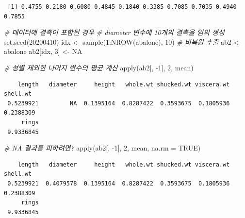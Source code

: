 \documentclass[
  11pt,
]{krantz}
\newenvironment{Shaded}{\begin{snugshade}}{\end{snugshade}}
\newcommand{\AttributeTok}[1]{\textcolor[rgb]{0.61,0.61,0.61}{#1}}
\newcommand{\CommentTok}[1]{\textcolor[rgb]{0.37,0.37,0.37}{\textit{#1}}}
\newcommand{\ConstantTok}[1]{\textcolor[rgb]{0,0,0}{#1}}
\newcommand{\DecValTok}[1]{\textcolor[rgb]{0.06,0.06,0.06}{#1}}
\newcommand{\FunctionTok}[1]{\textcolor[rgb]{0,0,0}{#1}}
\newcommand{\NormalTok}[1]{#1}
\newcommand{\OtherTok}[1]{\textcolor[rgb]{0.37,0.37,0.37}{#1}}
\newcommand{\SpecialCharTok}[1]{\textcolor[rgb]{0,0,0}{#1}}
\begin{document}
\begin{verbatim}
 [1] 0.4755 0.2180 0.6080 0.4845 0.1840 0.3385 0.7085 0.7035 0.4940 0.7855
\end{verbatim}

\begin{Shaded}
\begin{Highlighting}[]
\CommentTok{\# 데이터에 결측이 포함된 경우}
\CommentTok{\# diameter 변수에 10개의 결측을 임의 생성}
\FunctionTok{set.seed}\NormalTok{(}\DecValTok{20200410}\NormalTok{)}
\NormalTok{idx }\OtherTok{\textless{}{-}} \FunctionTok{sample}\NormalTok{(}\DecValTok{1}\SpecialCharTok{:}\FunctionTok{NROW}\NormalTok{(abalone), }\DecValTok{10}\NormalTok{) }\CommentTok{\# 비복원 추출}
\NormalTok{ab2 }\OtherTok{\textless{}{-}}\NormalTok{ abalone}
\NormalTok{ab2[idx, }\DecValTok{3}\NormalTok{] }\OtherTok{\textless{}{-}} \ConstantTok{NA}

\CommentTok{\# 성별 제외한 나머지 변수의 평균 계산}
\FunctionTok{apply}\NormalTok{(ab2[, }\SpecialCharTok{{-}}\DecValTok{1}\NormalTok{], }\DecValTok{2}\NormalTok{, mean)}
\end{Highlighting}
\end{Shaded}

\begin{verbatim}
    length   diameter     height   whole.wt shucked.wt viscera.wt   shell.wt 
 0.5239921         NA  0.1395164  0.8287422  0.3593675  0.1805936  0.2388309 
     rings 
 9.9336845 
\end{verbatim}

\begin{Shaded}
\begin{Highlighting}[]
\CommentTok{\# NA 결과를 피하려면?}
\FunctionTok{apply}\NormalTok{(ab2[, }\SpecialCharTok{{-}}\DecValTok{1}\NormalTok{], }\DecValTok{2}\NormalTok{, mean, }\AttributeTok{na.rm =} \ConstantTok{TRUE}\NormalTok{)}
\end{Highlighting}
\end{Shaded}

\begin{verbatim}
    length   diameter     height   whole.wt shucked.wt viscera.wt   shell.wt 
 0.5239921  0.4079578  0.1395164  0.8287422  0.3593675  0.1805936  0.2388309 
     rings 
 9.9336845 
\end{verbatim}

\normalsize

\footnotesize
\end{document}
